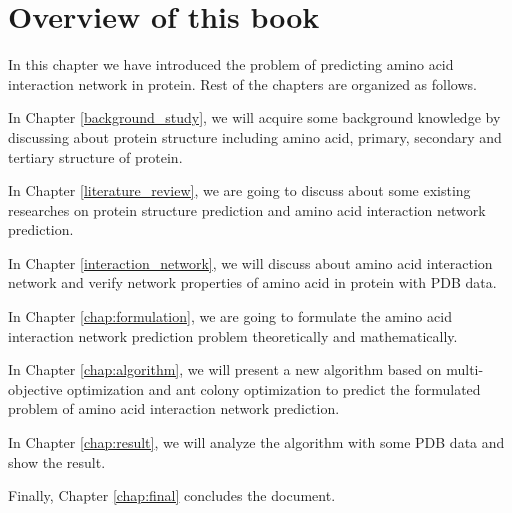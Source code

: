 \section{Overview of this book}
In this chapter we have introduced the problem of predicting amino acid interaction network in protein. Rest of the chapters are organized as follows.

In Chapter \ref{background_study}, we will acquire some background knowledge by discussing about protein structure including amino acid, primary, secondary and tertiary structure of protein.

In Chapter \ref{literature_review}, we are going to discuss about some existing researches on protein structure prediction and amino acid interaction network prediction.

In Chapter \ref{interaction_network}, we will discuss about amino acid interaction network and verify network properties of amino acid in protein with PDB data.

In Chapter \ref{chap:formulation}, we are going to formulate the amino acid interaction network prediction problem theoretically and mathematically. 

In Chapter \ref{chap:algorithm}, we will present a new algorithm based on multi-objective optimization and ant colony optimization to predict the formulated problem of amino acid interaction network prediction.

In Chapter \ref{chap:result}, we will analyze the algorithm with some PDB data and show the result.

Finally, Chapter \ref{chap:final} concludes the document.

